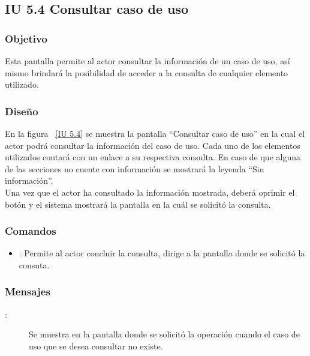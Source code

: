 \newpage 
\subsection{IU 5.4 Consultar caso de uso}

\subsubsection{Objetivo}
	
	Esta pantalla permite al actor consultar la información de un caso de uso, así mismo brindará la posibilidad de acceder a la consulta de cualquier elemento utilizado.

\subsubsection{Diseño}

    En la figura ~\ref{IU 5.4} se muestra la pantalla ``Consultar caso de uso'' en la cual el actor podrá consultar la información del caso de uso. Cada uno de los elementos utilizados contará con un enlace a su respectiva consulta. En caso de que alguna de las secciones no cuente con información se mostrará la leyenda ``Sin información''. \\
	
	Una vez que el actor ha consultado la información mostrada, deberá oprimir el botón  y el sistema mostrará la pantalla en la cuál se solicitó la consulta.


\subsubsection{Comandos}
\begin{itemize}
	\item {}: Permite al actor concluir la consulta, dirige a la pantalla donde se solicitó la consuta.
\end{itemize}

\subsubsection{Mensajes}
	
\begin{description}
	\item[:] Se muestra en la pantalla donde se solicitó la operación cuando el caso de uso que se desea consultar no existe.
\end{description}
